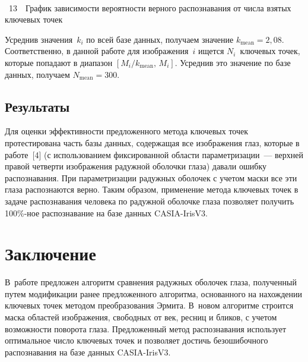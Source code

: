 \begin{multicols}{2}
\noindent
\begin{center} %
\vspace*{1pt}
\mbox{%
\epsfxsize=77.878mm
}
\end{center}
{{\figurename~13}\ \ \small{График зависимости вероятности верного распознавания от числа взятых ключевых точек }}
\vspace*{3pt}


\medskip
\addtocounter{figure}{1}


\noindent
 Усреднив значения~$k_i$ по всей базе 
данных, получаем значение $k_{\mathrm{mean}}=2{,}08$. Соответственно, в данной работе 
для изображения~$i$ ищется $N_i$~ключевых точек, которые попадают в 
диапазон $[M_i/k_{\mathrm{mean}},\,M_i]$. Усреднив это значение по базе данных, 
получаем $N_{\mathrm{mean}}=300$.

\vspace*{-4pt}

\subsection{Результаты}

Для оценки эффективности предложенного метода ключевых точек 
протестирована часть базы 
 данных, содержащая все изображения глаз, которые в 
работе~[4] (с использованием фиксированной области параметризации~--- верхней 
правой четверти изображения радужной оболочки глаза) давали ошибку 
распознавания. При параметризации радужных оболочек с учетом маски все эти 
глаза распознаются верно. Таким образом, применение метода ключевых точек в 
задаче распознавания человека по радужной оболочке глаза позволяет получить 
100\%-ное распознавание на базе данных CASIA-IrisV3.

\vspace*{-5pt}

\section{Заключение}

В~работе предложен алгоритм сравнения радужных оболочек глаза, полученный 
путем модификации ранее предложенного алгоритма, основанного на нахождении 
ключевых точек методом преобразования Эрмита. В~новом алгоритме строится 
маска областей изображения, свободных от век, ресниц и бликов, с учетом 
возможности поворота глаза. Предложенный метод распознавания использует 
оптимальное число ключевых точек и позволяет достичь безошибочного 
распознавания на базе данных CASIA-IrisV3.


\end{multicols}
